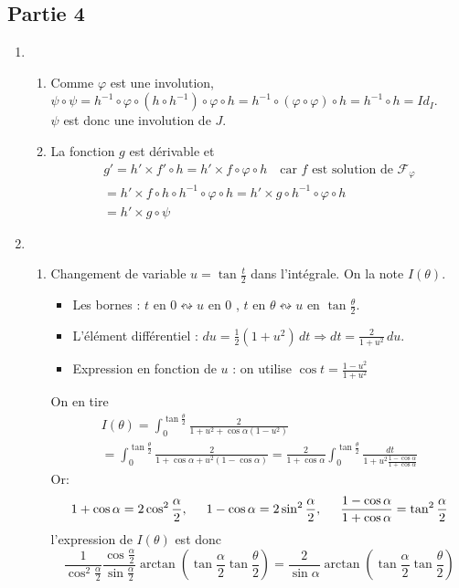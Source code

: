 \subsection*{Partie 4}
\begin{enumerate}
\item
\begin{enumerate}
\item Comme $\varphi$ est une involution,   $\psi\circ\psi=h^{-1}\circ \varphi\circ( h\circ h^{-1})\circ \varphi\circ h=h^{-1}\circ (\varphi\circ \varphi)\circ h=h^{-1}\circ h=Id_I$.\\
$\psi$ est donc une involution de $J$.
\item La fonction $g$ est dérivable et 
\begin{multline*}
g'= h'\times f'\circ h
= h'\times f\circ \varphi\circ h\quad \text{car $f$ est solution de } \mathcal F_\varphi \\
= h'\times f\circ h\circ h^{-1}\circ \varphi\circ h
= h'\times  g\circ h^{-1}\circ \varphi\circ h\\
= h'\times  g\circ\psi
\end{multline*}
\end{enumerate}
\item 
\begin{enumerate}
  \item Changement de variable $u = \tan \frac{t}{2}$ dans l'intégrale. On la note $I(\theta)$.
\begin{itemize}
  \item Les bornes : $t$ en $0\leftrightsquigarrow u \text{ en } 0$ , $t \text{ en }\theta \leftrightsquigarrow u \text{ en } \tan \frac{\theta}{2}$.
  \item L'élément différentiel : $du = \frac{1}{2}(1+u^2)\,dt \Rightarrow dt =\frac{2}{1+u^2}\,du$.
  \item Expression en fonction de $u$ : on utilise $\cos t = \frac{1-u^2}{1+u^2}$
\end{itemize}
On en tire
\begin{multline*}
I(\theta) = \int_0^{\tan\frac{\theta}{2}}\frac{2}{1+u^2+\cos\alpha(1-u^2)}\\
= \int_0^{\tan\frac{\theta}{2}}\frac{2}{1+\cos\alpha +u^2(1-\cos\alpha)}
= \frac{2}{1+\cos\alpha}\int_0^{\tan\frac{\theta}{2}}\frac{dt}{1+u^2\frac{1-\cos \alpha}{1+\cos \alpha}}
\end{multline*}
Or:
\begin{displaymath}
  1+\cos \alpha = 2 \cos^2 \frac{\alpha}{2},\hspace{0.5cm} 1-\cos\alpha = 2\sin^2\frac{\alpha}{2}
  ,\hspace{0.5cm } \frac{1-\cos \alpha}{1+\cos \alpha} = \tan^2\frac{\alpha}{2}
\end{displaymath}
l'expression de $I(\theta)$ est donc
\begin{displaymath}
\frac{1}{\cos^2 \frac{\alpha}{2}}\frac{\cos\frac{\alpha}{2}}{\sin \frac{\alpha}{2}}\arctan\left(\tan\frac{\alpha}{2}\tan\frac{\theta}{2} \right) 
  = \frac{2}{\sin \alpha}\arctan\left(\tan\frac{\alpha}{2}\tan\frac{\theta}{2} \right)
\end{displaymath}


\end{enumerate}
\end{enumerate}
